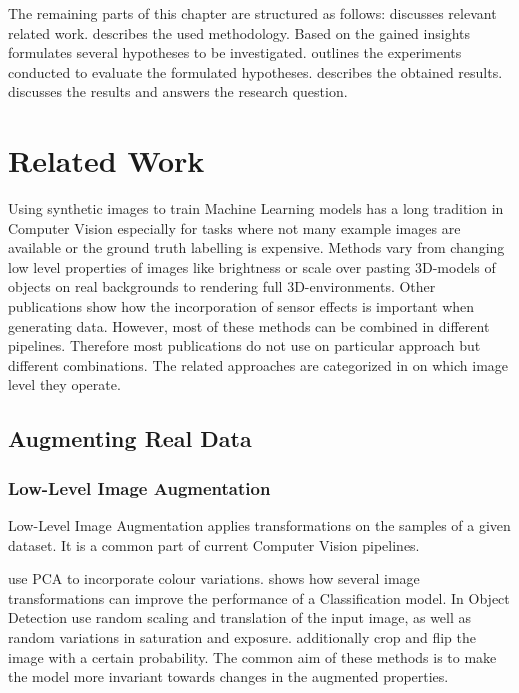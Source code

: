 The remaining parts of this chapter are structured as follows:  discusses relevant related work.  describes the used methodology. Based on the gained insights  formulates several hypotheses to be investigated.  outlines the experiments conducted to evaluate the formulated hypotheses.  describes the obtained results.  discusses the results and answers the research question.

\section{Related Work}
\label{sec:training:related}

Using synthetic images to train Machine Learning models has a long tradition in Computer Vision especially for tasks where not many example images are available or the ground truth labelling is expensive. Methods vary from changing low level properties of images like brightness or scale over pasting 3D-models of objects on real backgrounds to rendering full 3D-environments. Other publications show how the incorporation of sensor effects is important when generating data. However, most of these methods can be combined in different pipelines. Therefore most publications do not use on particular approach but different combinations. The related approaches are categorized in on which image level they operate.

\subsection{Augmenting Real Data}

\subsubsection{Low-Level Image Augmentation}

Low-Level Image Augmentation applies transformations on the samples of a given dataset. It is a common part of current Computer Vision pipelines.

\citeauthor{Krizhevsky2012a} \cite{Krizhevsky2012a} use PCA to incorporate colour variations. \cite{Howard2013} shows how several image transformations can improve the performance of a Classification model. In Object Detection \cite{Redmon} use random scaling and translation of the input image, as well as random variations in saturation and exposure. \citeauthor{Liu} \cite{Liu} additionally crop and flip the image with a certain probability. The common aim of these methods is to make the model more invariant towards changes in the augmented properties.

